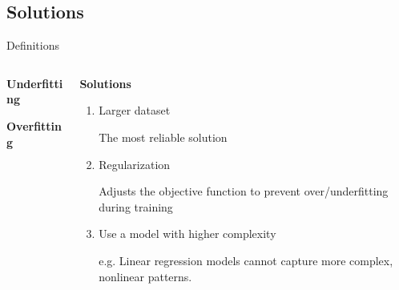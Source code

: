 \documentclass[UKenglish]{beamer}
\begin{document}
\subsection{Solutions}
\begin{frame}{Definitions}
    \begin{columns}[onlytextwidth]
        \begin{column}{0.48\textwidth}
            \begin{alertblock}{\small \textbf{Underfitting}}
            \end{alertblock}

            \begin{alertblock}{\small \textbf{Overfitting}}
                
            \end{alertblock}
        \end{column}

        \begin{column}{0.48\textwidth}
            \begin{alertblock}{\small \textbf{Solutions}}

            \begin{enumerate}
                \item {\small
                Larger dataset \par
                The most reliable solution
                }
                \vspace{5pt}
                \item {\small    
                Regularization \par
                Adjusts the objective function to prevent over/underfitting during training
                }
                \vspace{-5pt}
                \item {\small
                Use a model with higher complexity \par
                e.g. Linear regression models cannot capture more complex, nonlinear patterns. 
                }
            \end{enumerate}
            
            \end{alertblock}
        \end{column}
        
    \end{columns}

\end{frame}
\end{document}

